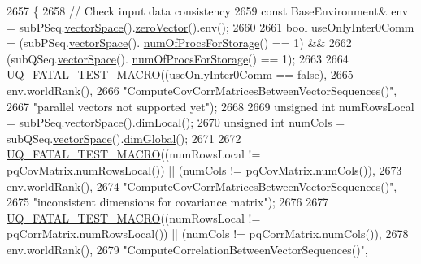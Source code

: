 \begin{DoxyCode}
2657 \{
2658   \textcolor{comment}{// Check input data consistency}
2659   \textcolor{keyword}{const} BaseEnvironment& env = subPSeq.\hyperlink{class_q_u_e_s_o_1_1_base_vector_sequence_af9a4dd979a2fa8dee85bb07793b59ba2}{vectorSpace}().\hyperlink{class_q_u_e_s_o_1_1_vector_space_a92e963bb5cab3eecd290dfe4b8f03b04}{zeroVector}().env();
2660 
2661   \textcolor{keywordtype}{bool} useOnlyInter0Comm = (subPSeq.\hyperlink{class_q_u_e_s_o_1_1_base_vector_sequence_af9a4dd979a2fa8dee85bb07793b59ba2}{vectorSpace}().
      \hyperlink{class_q_u_e_s_o_1_1_vector_space_a67b0c3620662116f5a346fdaa5faf38e}{numOfProcsForStorage}() == 1) &&
2662                            (subQSeq.\hyperlink{class_q_u_e_s_o_1_1_base_vector_sequence_af9a4dd979a2fa8dee85bb07793b59ba2}{vectorSpace}().
      \hyperlink{class_q_u_e_s_o_1_1_vector_space_a67b0c3620662116f5a346fdaa5faf38e}{numOfProcsForStorage}() == 1);
2663 
2664   \hyperlink{_defines_8h_a56d63d18d0a6d45757de47fcc06f574d}{UQ\_FATAL\_TEST\_MACRO}((useOnlyInter0Comm == \textcolor{keyword}{false}),
2665                       env.worldRank(),
2666                       \textcolor{stringliteral}{"ComputeCovCorrMatricesBetweenVectorSequences()"},
2667                       \textcolor{stringliteral}{"parallel vectors not supported yet"});
2668 
2669   \textcolor{keywordtype}{unsigned} \textcolor{keywordtype}{int} numRowsLocal = subPSeq.\hyperlink{class_q_u_e_s_o_1_1_base_vector_sequence_af9a4dd979a2fa8dee85bb07793b59ba2}{vectorSpace}().\hyperlink{class_q_u_e_s_o_1_1_vector_space_a5829a1f4f996f8307c840b705144d666}{dimLocal}();
2670   \textcolor{keywordtype}{unsigned} \textcolor{keywordtype}{int} numCols = subQSeq.\hyperlink{class_q_u_e_s_o_1_1_base_vector_sequence_af9a4dd979a2fa8dee85bb07793b59ba2}{vectorSpace}().\hyperlink{class_q_u_e_s_o_1_1_vector_space_acd4359dc120905c22ca1064e33787239}{dimGlobal}();
2671 
2672   \hyperlink{_defines_8h_a56d63d18d0a6d45757de47fcc06f574d}{UQ\_FATAL\_TEST\_MACRO}((numRowsLocal != pqCovMatrix.numRowsLocal()) || (numCols != 
      pqCovMatrix.numCols()),
2673                       env.worldRank(),
2674                       \textcolor{stringliteral}{"ComputeCovCorrMatricesBetweenVectorSequences()"},
2675                       \textcolor{stringliteral}{"inconsistent dimensions for covariance matrix"});
2676 
2677   \hyperlink{_defines_8h_a56d63d18d0a6d45757de47fcc06f574d}{UQ\_FATAL\_TEST\_MACRO}((numRowsLocal != pqCorrMatrix.numRowsLocal()) || (numCols != 
      pqCorrMatrix.numCols()),
2678                       env.worldRank(),
2679                       \textcolor{stringliteral}{"ComputeCorrelationBetweenVectorSequences()"},

\end{DoxyCode}
